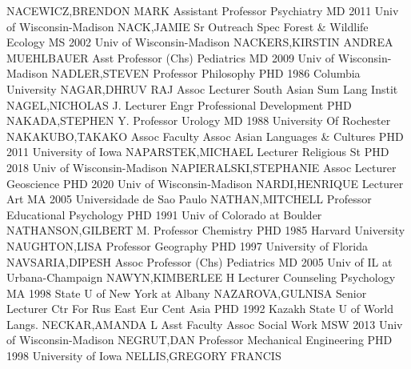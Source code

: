 \documentclass[
]{article}
\begin{document}
NACEWICZ,BRENDON MARK \textbar Assistant Professor \textbar Psychiatry
\textbar MD 2011 Univ of Wisconsin-Madison \textbar{} 
\textbar NACK,JAMIE \textbar Sr Outreach Spec \textbar Forest \&
Wildlife Ecology \textbar MS 2002 Univ of Wisconsin-Madison \textbar{}
 \textbar NACKERS,KIRSTIN ANDREA MUEHLBAUER \textbar Asst
Professor (Chs) \textbar Pediatrics \textbar MD 2009 Univ of
Wisconsin-Madison \textbar{}  \textbar NADLER,STEVEN
\textbar Professor \textbar Philosophy \textbar PHD 1986 Columbia
University \textbar{}  \textbar NAGAR,DHRUV RAJ
\textbar Assoc Lecturer \textbar South Asian Sum Lang Instit
\textbar NAGEL,NICHOLAS J. \textbar{}  \textbar Lecturer
\textbar Engr Professional Development \textbar PHD
\textbar NAKADA,STEPHEN Y. \textbar{}  \textbar Professor
\textbar Urology \textbar MD 1988 University Of Rochester
\textbar NAKAKUBO,TAKAKO \textbar{}  \textbar Assoc Faculty
Assoc \textbar Asian Languages \& Cultures \textbar PHD 2011 University
of Iowa \textbar NAPARSTEK,MICHAEL \textbar{} 
\textbar Lecturer \textbar Religious St \textbar PHD 2018 Univ of
Wisconsin-Madison \textbar NAPIERALSKI,STEPHANIE \textbar{} 
\textbar Assoc Lecturer \textbar Geoscience \textbar PHD 2020 Univ of
Wisconsin-Madison \textbar NARDI,HENRIQUE \textbar{} 
\textbar Lecturer \textbar Art \textbar MA 2005 Universidade de Sao
Paulo \textbar NATHAN,MITCHELL \textbar{} 
\textbar Professor \textbar Educational Psychology \textbar PHD 1991
Univ of Colorado at Boulder \textbar NATHANSON,GILBERT M. \textbar{}
 \textbar Professor \textbar Chemistry \textbar PHD 1985
Harvard University \textbar NAUGHTON,LISA \textbar{} 
\textbar Professor \textbar Geography \textbar PHD 1997 University of
Florida \textbar NAVSARIA,DIPESH \textbar{}  \textbar Assoc
Professor (Chs) \textbar Pediatrics \textbar MD 2005 Univ of IL at
Urbana-Champaign \textbar NAWYN,KIMBERLEE H \textbar{} 
\textbar Lecturer \textbar Counseling Psychology \textbar MA 1998 State
U of New York at Albany \textbar NAZAROVA,GULNISA \textbar{}
 \textbar Senior Lecturer \textbar Ctr For Rus East Eur Cent
Asia \textbar PHD 1992 Kazakh State U of World Langs.
\textbar NECKAR,AMANDA L \textbar{}  \textbar Asst Faculty
Assoc \textbar Social Work \textbar MSW 2013 Univ of Wisconsin-Madison
\textbar NEGRUT,DAN \textbar{}  \textbar Professor
\textbar Mechanical Engineering \textbar PHD 1998 University of Iowa
\textbar NELLIS,GREGORY FRANCIS \textbar{} 
\end{document}
